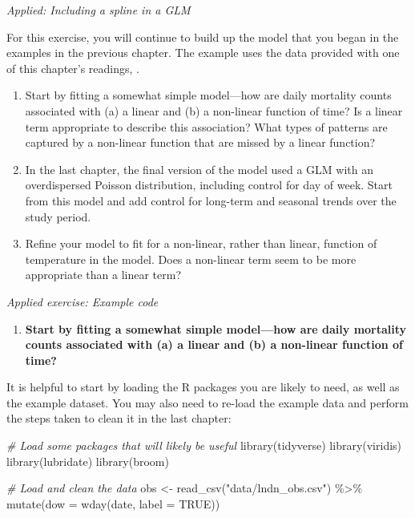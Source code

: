 \documentclass[
]{book}
\newenvironment{Shaded}{\begin{snugshade}}{\end{snugshade}}
\newcommand{\AttributeTok}[1]{\textcolor[rgb]{0.77,0.63,0.00}{#1}}
\newcommand{\CommentTok}[1]{\textcolor[rgb]{0.56,0.35,0.01}{\textit{#1}}}
\newcommand{\ConstantTok}[1]{\textcolor[rgb]{0.00,0.00,0.00}{#1}}
\newcommand{\FunctionTok}[1]{\textcolor[rgb]{0.00,0.00,0.00}{#1}}
\newcommand{\NormalTok}[1]{#1}
\newcommand{\OtherTok}[1]{\textcolor[rgb]{0.56,0.35,0.01}{#1}}
\newcommand{\SpecialCharTok}[1]{\textcolor[rgb]{0.00,0.00,0.00}{#1}}
\newcommand{\StringTok}[1]{\textcolor[rgb]{0.31,0.60,0.02}{#1}}
\providecommand{\tightlist}{%
  \setlength{\itemsep}{0pt}\setlength{\parskip}{0pt}}
\begin{document}
\emph{Applied: Including a spline in a GLM}

For this exercise, you will continue to build up the model that you began in
the examples in the previous chapter. The example uses the data provided with
one of this chapter's readings, \citet{vicedo2019hands}.

\begin{enumerate}
\def\labelenumi{\arabic{enumi}.}
\tightlist
\item
  Start by fitting a somewhat simple model---how are daily mortality counts
  associated with (a) a linear and (b) a non-linear function of time? Is a linear
  term appropriate to describe this association? What types of patterns are
  captured by a non-linear function that are missed by a linear function?
\item
  In the last chapter, the final version of the model used a GLM with an
  overdispersed Poisson distribution, including control for day of week.
  Start from this model and add control for long-term and seasonal trends
  over the study period.
\item
  Refine your model to fit for a non-linear, rather than linear, function
  of temperature in the model. Does a non-linear term seem to be more
  appropriate than a linear term?
\end{enumerate}

\emph{Applied exercise: Example code}

\begin{enumerate}
\def\labelenumi{\arabic{enumi}.}
\tightlist
\item
  \textbf{Start by fitting a somewhat simple model---how are daily mortality counts
  associated with (a) a linear and (b) a non-linear function of time?}
\end{enumerate}

It is helpful to start by loading the R packages you are likely to need, as
well as the example dataset. You may also need to re-load the example data
and perform the steps taken to clean it in the last chapter:

\begin{Shaded}
\begin{Highlighting}[]
\CommentTok{\# Load some packages that will likely be useful}
\FunctionTok{library}\NormalTok{(tidyverse)}
\FunctionTok{library}\NormalTok{(viridis)}
\FunctionTok{library}\NormalTok{(lubridate)}
\FunctionTok{library}\NormalTok{(broom)}

\CommentTok{\# Load and clean the data}
\NormalTok{obs }\OtherTok{\textless{}{-}} \FunctionTok{read\_csv}\NormalTok{(}\StringTok{"data/lndn\_obs.csv"}\NormalTok{) }\SpecialCharTok{\%\textgreater{}\%} 
  \FunctionTok{mutate}\NormalTok{(}\AttributeTok{dow =} \FunctionTok{wday}\NormalTok{(date, }\AttributeTok{label =} \ConstantTok{TRUE}\NormalTok{))}
\end{Highlighting}
\end{Shaded}
\end{document}
